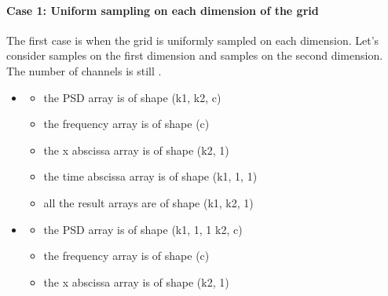 \documentclass[letterpaper,10pt,english]{sphinxmanual}
\begin{document}
\paragraph{Case 1: Uniform sampling on each dimension of the grid}
\label{\detokenize{source/normalization:case-1-uniform-sampling-on-each-dimension-of-the-grid}}
\sphinxAtStartPar
The first case is when the grid is uniformly sampled on each dimension. Let’s consider  samples on the first dimension and  samples on the second dimension. The number of channels is still .
\begin{itemize}
\item {} \begin{description}
\begin{itemize}
\item {} 
\sphinxAtStartPar
the PSD array is of shape (k1, k2, c)

\item {} 
\sphinxAtStartPar
the frequency array is of shape (c)

\item {} 
\sphinxAtStartPar
the x abscissa array is of shape (k2, 1)

\item {} 
\sphinxAtStartPar
the time abscissa array is of shape (k1, 1, 1)

\item {} 
\sphinxAtStartPar
all the result arrays are of shape (k1, k2, 1)

\end{itemize}

\end{description}

\item {} \begin{description}
\begin{itemize}
\item {} 
\sphinxAtStartPar
the PSD array is of shape (k1, 1, 1 k2, c)

\item {} 
\sphinxAtStartPar
the frequency array is of shape (c)

\item {} 
\sphinxAtStartPar
the x abscissa array is of shape (k2, 1)


\end{itemize}
\end{description}
\end{itemize}
\end{document}
